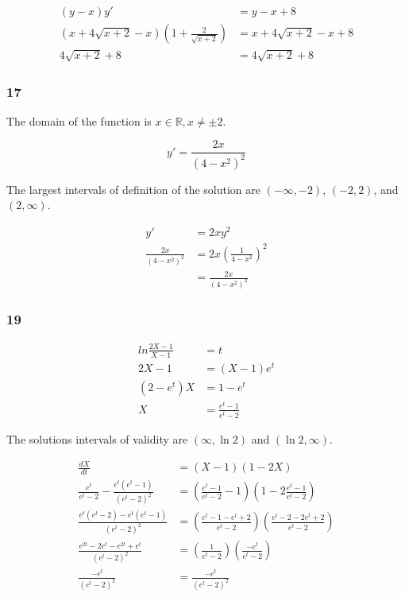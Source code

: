 \documentclass{article}
\begin{document}
\begin{align*}
  (y - x) y'                                            & = y - x + 8                  \\
  (x + 4 \sqrt{x + 2} - x) (1 + \frac{2}{\sqrt{x + 2}}) & = x + 4 \sqrt{x + 2} - x + 8 \\
  4 \sqrt{x + 2} + 8                                    & = 4 \sqrt{x + 2} + 8
\end{align*}

\subsubsection{17}

The domain of the function is $x \in \mathbb{R}, x \ne \pm 2$.

\[y' = \frac{2 x}{(4 - x^2)^2}\]

The largest intervals of definition of the solution are $(-\infty, -2)$, $(-2, 2)$, and $(2, \infty)$.

\begin{align*}
  y'                      & = 2 x y^2                                \\
  \frac{2 x}{(4 - x^2)^2} & = 2 x \left( \frac{1}{4 - x^2} \right)^2 \\
                          & = \frac{2x}{(4 - x^2)^2}
\end{align*}

\subsubsection{19}

\begin{align*}
  ln \frac{2 X - 1}{X - 1} & = t                       \\
  2 X - 1                  & = (X - 1) e^t             \\
  (2 - e^t) X              & = 1 - e^t                 \\
  X                        & = \frac{e^t - 1}{e^t - 2}
\end{align*}

The solutions intervals of validity are $(\infty, \ln 2)$ and $(\ln 2, \infty)$.

\begin{align*}
  \frac{dX}{dt}                                           & = (X - 1) (1 - 2 X)                                                                                   \\
  \frac{e^t}{e^t - 2} - \frac{e^t (e^t - 1)}{(e^t - 2)^2} & = \left( \frac{e^t - 1}{e^t - 2} - 1 \right) \left( 1 - 2 \frac{e^t - 1}{e^t - 2} \right)             \\
  \frac{e^t (e^t - 2) - e^t (e^t - 1)}{(e^t - 2)^2}       & = \left( \frac{e^t - 1 - e^t + 2}{e^t - 2} \right) \left( \frac{e^t - 2 - 2 e^t + 2}{e^t - 2} \right) \\
  \frac{e^{2t} - 2 e^t - e^{2t} + e^t}{(e^t - 2)^2}       & = \left( \frac{1}{e^t - 2} \right) \left( \frac{-e^t}{e^t - 2} \right)                                \\
  \frac{-e^t}{(e^t - 2)^2}                                & = \frac{-e^t}{(e^t - 2)^2}
\end{align*}
\end{document}
